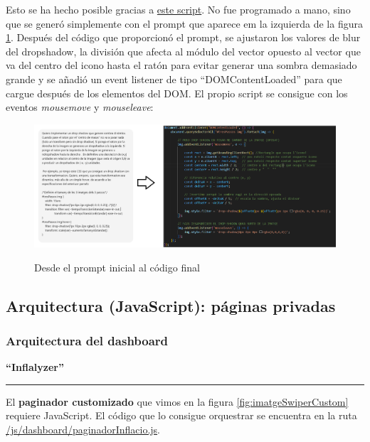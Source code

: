 \documentclass[a4paper,12pt]{report}
\begin{document}
	Esto se ha hecho posible gracias a  \href{https://github.com/blackcub3s/mercApp/blob/main/APP%20WEB/__frontend__produccio__/app/js/pas4/dropShadowReactiu.js}{este script}. No fue programado a mano, sino que se generó simplemente con el prompt que aparece em la izquierda de la figura \ref{fig:promptScriptDropShadow}. Después del código que proporcionó el prompt, se ajustaron los valores de blur del dropshadow, la división que afecta al módulo del vector opuesto al vector que va del centro del icono hasta el ratón para evitar generar una sombra demasiado grande y se añadió un event listener de tipo ``DOMContentLoaded'' para que cargue después de los elementos del DOM. El propio script se consigue con los eventos \textit{mousemove} y \textit{mouseleave}:
	
	\begin{figure}[H]
		\centering
		\caption{Desde el prompt inicial al código final}
		\includegraphics[width=1\linewidth]{img/promptScriptDropShadow}
		\label{fig:promptScriptDropShadow}
	\end{figure}
	
	
	\subsection{Arquitectura (JavaScript): páginas privadas}
	
	\subsubsection{Arquitectura del dashboard}
	\label{sec:paginadorJavascriptArquitectura}
	
	
	\noindent \textbf{``Inflalyzer''}
	\hrule
	\vspace{.5em}
	
	El \textbf{paginador customizado} que vimos en la figura \ref{fig:imatgeSwiperCustom} requiere JavaScript. El código que lo consigue orquestrar se encuentra en la ruta \href{https://github.com/blackcub3s/mercApp/blob/main/APP%20WEB/__frontend__produccio__/app/js/dashboard/paginadorInflacio.js}{/js/dashboard/paginadorInflacio.js}. 
	
\end{document}
